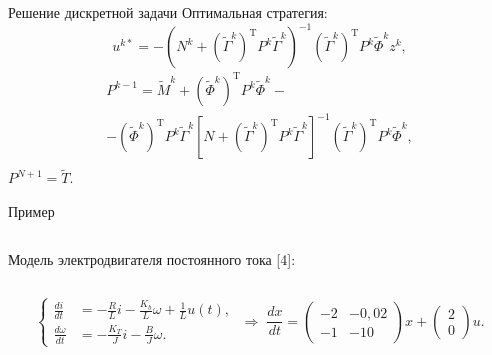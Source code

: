         \begin{frame}{Решение дискретной задачи}
                Оптимальная стратегия:
                $$
                        \boxed{
                                u^{k*} = -(N^k + (\tilde\Gamma^k)^{\mathrm{T}} P^{k}\tilde\Gamma^k)^{-1}(\tilde\Gamma^k)^{\mathrm{T}} P^{k} \tilde\Phi^k z^k,
                        }
                $$
                \begin{multline*}
                        P^{k-1} = \tilde M^k + (\tilde\Phi^k)^{\mathrm{T}}P^k\tilde\Phi^k
                        -\\- (\tilde\Phi^k)^{\mathrm{T}}P^k\tilde\Gamma^k[N
                        + (\tilde\Gamma^k)^{\mathrm{T}}P^k\tilde\Gamma^k]^{-1}(\tilde\Gamma^k)^{\mathrm{T}}P^k\tilde\Phi^k, \\
                \end{multline*}
                $
                        P^{N+1} = \tilde T.
                $
        \end{frame}
        \begin{frame}{Пример}
                \begin{columns}
                        \begin{column}{0.4\textwidth}
                                Модель электродвигателя постоянного тока [4]:
                        \end{column}
                        \begin{column}{0.6\textwidth}
                                
                        \end{column}
                \end{columns}
                $$
                        \left\{
                        \begin{aligned}
                        \frac {di}{dt}
                        &=
                        -\frac{R}{L}i
                        -
                        \frac{K_b}{L}\omega
                        +
                        \frac{1}{L}u(t),\\
                        \frac{d\omega}{dt}
                        &=
                        -\frac{K_T}{J}i
                        -
                        \frac{B}{J}\omega.
                        \end{aligned}
                        \right.
                        \;\Longrightarrow\;
                                \frac{dx}{dt}
                                =
                                \begin{pmatrix}
                        -2 & -0,\!02 \\
                        -1 & -10
                                \end{pmatrix}
                                x
                                +
                                \begin{pmatrix}
                        2 \\
                        0
                                \end{pmatrix}
                                u.
                $$
        \end{frame}
